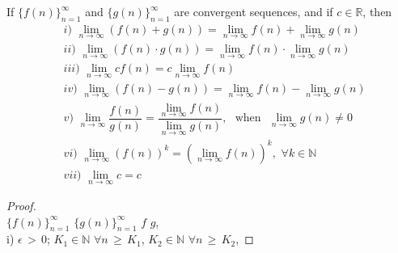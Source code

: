 \begin{theorem}
If $\{f(n)\}_{n=1}^{\infty}$ and $\{g(n)\}_{n=1}^{\infty}$ are convergent sequences, and if $c \in \mathbb{R}$, then
\begin{align*}
    &i) \hspace{4pt} \lim_{n \longrightarrow \infty} (f(n) + g(n)) = \lim_{n \longrightarrow \infty} f(n) + \lim_{n \longrightarrow \infty} g(n) \\[2ex]
    &ii) \hspace{4pt} \lim_{n \longrightarrow \infty} (f(n) \cdot g(n)) = \lim_{n \longrightarrow \infty} f(n) \cdot \lim_{n \longrightarrow \infty} g(n)\\[2ex]
    &iii) \hspace{4pt} \lim_{n \longrightarrow \infty} cf(n) = c\lim_{n \longrightarrow \infty} f(n)\\[2ex]
    &iv) \hspace{4pt} \lim_{n \longrightarrow \infty}(f(n) - g(n)) = \lim_{n \longrightarrow \infty} f(n) - \lim_{n \longrightarrow \infty} g(n)\\[2ex]
    &v) \hspace{4pt} \lim_{n \longrightarrow \infty}\dfrac{f(n)}{g(n)} = \dfrac{\lim_{n \longrightarrow \infty} f(n)}{\lim_{n \longrightarrow \infty} g(n)}, \hspace{4pt} \text{ when } \hspace{4pt} \lim_{n \longrightarrow \infty} g(n) \neq 0\\[2ex]
    &vi) \hspace{4pt} \lim_{n \longrightarrow \infty} (f(n))^{k} = (\lim_{n \longrightarrow \infty} f(n))^{k}, \hspace{4pt} \forall k \in \mathbb{N}\\[2ex]
    &vii) \hspace{4pt} \lim_{n \longrightarrow \infty} c = c
\end{align*}
\label{properties_limit_sequence_numbers}
\newpage
\begin{proof} 
    \\[8ex]
     $\{f(n)\}_{n = 1}^{\infty}$  $\{g(n)\}_{n = 1}^{\infty}$  $f$  $g$, \\
    i)  $\epsilon \hspace{2pt} > \hspace{2pt} 0$;  $K_{1} \in \mathbb{N}$  $\forall n \hspace{2pt} \geq \hspace{2pt} K_{1}$,  $K_{2} \in \mathbb{N}$  $\forall n \hspace{2pt} \geq \hspace{2pt} K_{2}$, 

\end{proof}
\end{theorem}
